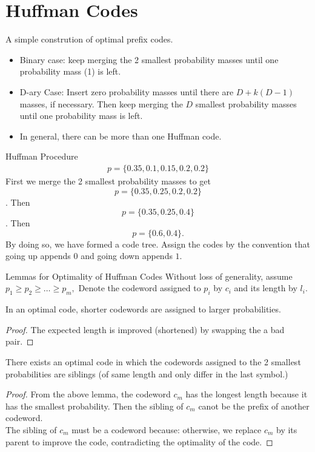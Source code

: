 \documentclass[../main.tex]{subfiles}
\begin{document}
\section*{Huffman Codes}
A simple constrution of optimal prefix codes.
\begin{itemize}
    \item Binary case: keep merging the 2 smallest probability masses until one probability mass (1) is left.
    \item D-ary Case: Insert zero probability masses until there are $D+k(D-1)$ masses, if necessary. Then keep merging the $D$ smallest probability masses until one probability mass is left.
    \item In general, there can be more than one Huffman code.
\end{itemize}
\begin{pbox}{Huffman Procedure}
    \begin{align*}
        p=\{0.35, 0.1, 0.15, 0.2, 0.2\}
    \end{align*}
    First we merge the 2 smallest probability masses to get \[
    p=\{0.35, 0.25, 0.2, 0.2\}
    \]. Then \[p=\{0.35, 0.25, 0.4\}\].
    Then \[p=\{0.6, 0.4\}.\]
    By doing so, we have formed a code tree. Assign the codes by the convention that going up appends $0$ and going down appends $1$.
\end{pbox}
\begin{bbox}{Lemmas for Optimality of Huffman Codes}
    Without loss of generality, assume $p_1\geq p_2\geq\dots \geq p_m,$ Denote the codeword assigned to $p_i$ by $c_i$ and its length by $l_i.$
    \begin{lemma}
        In an optimal code, shorter codewords are assigned to larger probabilities.
        \begin{proof}
            The expected length is improved (shortened) by swapping the a bad pair.
        \end{proof}
    \end{lemma}
    \begin{lemma}
        There exists an optimal code in which the codewords assigned to the 2 smallest probabilities are siblings (of same length and only differ in the last symbol.)
        \begin{proof}
            From the above lemma, the codeword $c_m$ has the longest length because it has the smallest probability. Then the sibling of $c_m$ canot be the prefix of another codeword. \\
            The sibling of $c_m$ must be a codeword because: otherwise, we replace $c_m$ by its parent to improve the code, contradicting the optimality of the code.
        \end{proof}
    \end{lemma}
\end{bbox}
\end{document}
